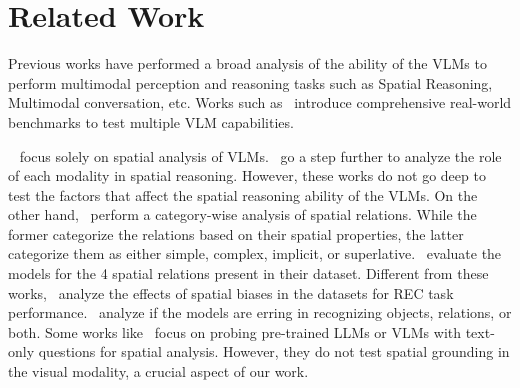 \section{Related Work}
\label{sec:rel work}
Previous works have performed a broad analysis of the ability of the VLMs to perform multimodal perception and reasoning tasks such as Spatial Reasoning, Multimodal conversation, etc. Works such as~\cite{cb300k,llava,mmbench,seedbench,mmvet,blink} introduce comprehensive real-world benchmarks to test multiple VLM capabilities.

~\cite{roschpi,subramaniamreclip} focus solely on spatial analysis of VLMs.~\cite{pic1k} go a step further to analyze the role of each modality in spatial reasoning. However, these works do not go deep to test the factors that affect the spatial reasoning ability of the VLMs. On the other hand,~\cite{vsr,film} perform a category-wise analysis of spatial relations. While the former categorize the relations based on their spatial properties, the latter categorize them as either simple, complex, implicit, or superlative.~\cite{sr2d} evaluate the models for the 4 spatial relations present in their dataset. Different from these works,~\cite{whatsup} analyze the effects of spatial biases in the datasets for REC task performance.~\cite{clipcdsm} analyze if the models are erring in recognizing objects, relations, or both. Some works like~\cite{cohn,liuother,mirzaee} focus on probing pre-trained LLMs or VLMs with text-only questions for spatial analysis. However, they do not test spatial grounding in the visual modality, a crucial aspect of our work.

